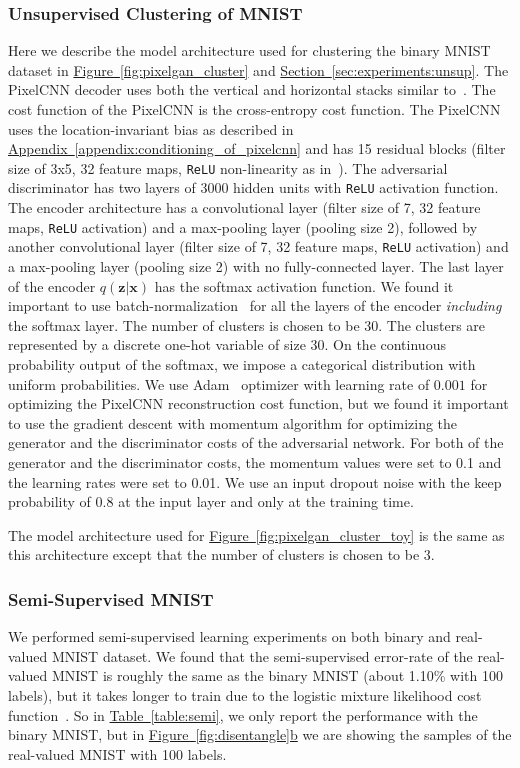 \documentclass{article}
\newcommand{\mysec}[1]{\hyperref[sec:#1]{Section~\ref*{sec:#1}}}
\newcommand{\mytable}[1]{\hyperref[table:#1]{Table~\ref*{table:#1}}}
\newcommand{\myfig}[1]{\hyperref[fig:#1]{Figure~\ref*{fig:#1}}}
\newcommand{\myfigg}[2]{\hyperref[fig:#1]{Figure~\ref*{fig:#1}#2}}
\newcommand{\myappendix}[1]{\hyperref[appendix:#1]{Appendix~\ref*{appendix:#1}}}
\begin{document}
\begin{appendices}
\subsubsection{Unsupervised Clustering of MNIST}\label{appendix:cluster-mnist}
Here we describe the model architecture used for clustering the binary MNIST dataset in \myfig{pixelgan_cluster} and \mysec{experiments:unsup}. The PixelCNN decoder uses both the vertical and horizontal stacks similar to~\citep{pixelcnn}. The cost function of the PixelCNN is the cross-entropy cost function. 
The PixelCNN uses the location-invariant bias as described in \myappendix{conditioning_of_pixelcnn} and has 15 residual blocks (filter size of 3x5, 32 feature maps, \texttt{ReLU} non-linearity as in~\citep{pixelcnn}). The adversarial discriminator has two layers of 3000 hidden units with \texttt{ReLU} activation function. 
The encoder architecture has a convolutional layer (filter size of 7, 32 feature maps, \texttt{ReLU} activation) and a max-pooling layer (pooling size 2), followed by another convolutional layer (filter size of 7, 32 feature maps, \texttt{ReLU} activation) and a max-pooling layer (pooling size 2) with no fully-connected layer. 
The last layer of the encoder $q(\mathbf{z}|\mathbf{x})$ has the softmax activation function. We found it important to use batch-normalization~\citep{batch} for all the layers of the encoder \emph{including} the softmax layer. 
The number of clusters is chosen to be $30$. The clusters are represented by a discrete one-hot variable of size 30. On the continuous probability output of the softmax, we impose a categorical distribution with uniform probabilities. 
We use Adam~\citep{Adam} optimizer with learning rate of $0.001$ for optimizing the PixelCNN reconstruction cost function, but we found it important to use the gradient descent with momentum algorithm for optimizing the generator and the discriminator costs of the adversarial network. 
For both of the generator and the discriminator costs, the momentum values were set to 0.1 and the learning rates were set to 0.01. 
We use an input dropout noise with the keep probability of $0.8$ at the input layer and only at the training time. 

The model architecture used for \myfig{pixelgan_cluster_toy} is the same as this architecture except that the number of clusters is chosen to be $3$.


\subsubsection{Semi-Supervised MNIST}\label{appendix:semi-mnist}
We performed semi-supervised learning experiments on both binary and real-valued MNIST dataset. We found that the semi-supervised error-rate of the real-valued MNIST is roughly the same as the binary MNIST (about 1.10\% with 100 labels), but it takes longer to train due to the logistic mixture likelihood cost function~\citep{pixelcnn++}. So in \mytable{semi}, we only report the performance with the binary MNIST, but in \myfigg{disentangle}{b} we are showing the samples of the real-valued MNIST with 100 labels.


\end{appendices}
\end{document}
